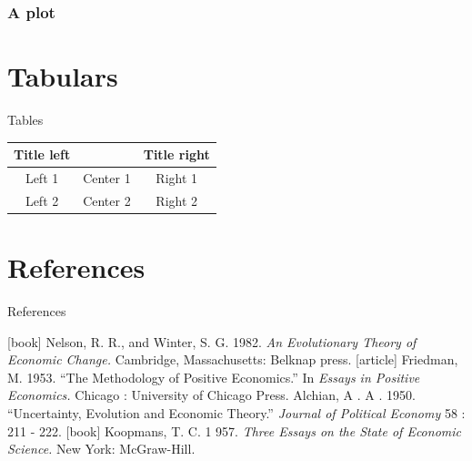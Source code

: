 \documentclass{beamer}                %
\begin{document}
\begin{frame}[fragile]
\frametitle{A plot}
\begin{center}

\end{center}
\end{frame}



\section{Tabulars}
\begin{frame}{Tables}
\begin{center}
\begin{tabular}{ccc}
\toprule
Title left &          & Title right \\
\midrule \pause
Left 1     & Center 1 & Right 1 \\
Left 2     & Center 2 & Right 2 \\
\bottomrule
\end{tabular}
\end{center}
\end{frame}



\section{References}
\begin{frame}{References}
\begin{thebibliography}{9}
[book]
 Nelson, R. R., and Winter, S. G. 1982. \emph{An Evolutionary Theory of Economic Change.} Cambridge, Massachusetts: Belknap press.
[article]
 Friedman, M. 1953. ``The Methodology of Positive Economics.'' In \emph{Essays in
Positive Economics.} Chicago : University of Chicago Press.
 Alchian, A . A . 1950. ``Uncertainty, Evolution and Economic Theory.'' \emph{Journal
of Political Economy} 58 : 211 - 222.
[book]
 Koopmans, T. C. 1 957. \emph{Three Essays on the State of Economic Science.} New
York: McGraw-Hill.
\end{thebibliography}
\end{frame}



\appendix
\end{document}

